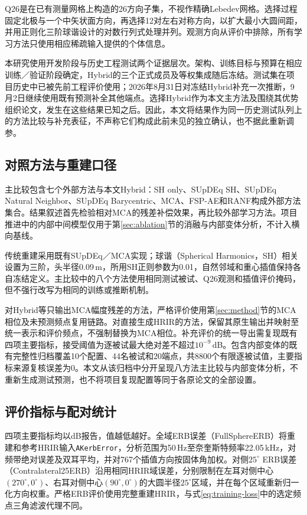 Q26是在已有测量网格上构造的26方向子集，不视作精确Lebedev网格。选择过程固定北极与一个中矢状面方向，再选择12对左右对称方向，以扩大最小大圆间距，并用正则化三阶球谐设计的对数行列式处理并列。观测方向从评价中排除，所有学习方法只使用相应稀疏输入提供的个体信息。

本研究使用开发阶段与历史工程测试两个证据层次。架构、训练目标与预算在相应训练／验证阶段确定，Hybrid的三个正式成员及等权集成随后冻结。测试集在项目历史中已被先前工程评价使用；2026年8月31日对冻结Hybrid补充一次推断，9月2日继续使用既有预测补全其他端点。选择Hybrid作为本文主方法及围绕其优势组织论文，发生在这些结果已知之后。因此，本文将结果作为同一历史测试队列上的方法比较与补充表征，不声称它们构成此前未见的独立确认，也不据此重新调参。

\subsection{对照方法与重建口径}
主比较包含七个外部方法与本文Hybrid：SH only、SUpDEq SH、SUpDEq Natural Neighbor、SUpDEq Barycentric、MCA、FSP-AE和RANF构成外部方法集合。结果叙述首先检验相对MCA的残差补偿效果，再比较外部学习方法。项目推进中的内部中间模型仅用于第\ref{sec:ablation}节的消融与内部变体分析，不计入横向基线。

传统重建采用既有SUpDEq／MCA实现；球谐（Spherical Harmonics，SH）相关设置为三阶，头半径0.09\,m，所用SH正则参数为0.01，自然邻域和重心插值保持各自冻结定义。主比较中的八个方法使用相同测试被试、Q26观测和插值评价掩码，但不强行改写为相同的训练或推断机制。

对Hybrid等只输出MCA幅度残差的方法，严格评价使用第\ref{sec:method}节的MCA相位及未预测频点复用链路。对直接生成HRIR的方法，保留其原生输出并映射至统一表示和评价频点，不强制替换为MCA相位。补充评价的统一导出需复现既有四项主要指标，接受阈值为逐被试最大绝对差不超过$10^{-9}$\,dB。包含内部变体的既有完整性归档覆盖10个配置、44名被试和20端点，共8800个有限逐被试值，主要指标来源复核误差为0。本文从该归档中分开呈现八方法主比较与内部变体分析，不重新生成测试预测，也不将项目复现配置等同于各原论文的全部设置。

\subsection{评价指标与配对统计}
四项主要指标均以dB报告，值越低越好。全域ERB误差（FullSphereERB）将重建和参考HRIR输入\texttt{AKerbError}，分析范围为50\,Hz至奈奎斯特频率22.05\,kHz，对频带绝对误差及双耳平均，并对767个插值方向按固体角加权。对侧$25^\circ$ ERB误差（Contralateral25ERB）沿用相同HRIR域误差，分别限制在左耳对侧中心$(270^\circ,0^\circ)$、右耳对侧中心$(90^\circ,0^\circ)$的大圆半径$25^\circ$区域，并在每个区域重新归一化方向权重。严格ERB评价使用完整重建HRIR，与式\eqref{eq:training-loss}中的选定频点三角滤波代理不同。

